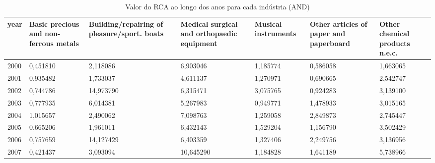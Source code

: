 \begin{table}
\centering
\caption{Valor do RCA ao longo dos anos para cada indústria (AND)}
\begin{tabular}{p{1cm}p{2cm}p{2cm}p{2cm}p{2cm}p{2cm}p{2cm}}
\toprule
 year &  Basic precious and non-ferrous metals &  Building/repairing of pleasure/sport. boats &  Medical surgical and orthopaedic equipment &  Musical instruments &  Other articles of paper and paperboard &  Other chemical products n.e.c. \\
\midrule
 2000 &                               0,451810 &                                     2,118086 &                                    6,903046 &             1,185774 &                                0,586058 &                        1,663065 \\
 2001 &                               0,935482 &                                     1,733037 &                                    4,611137 &             1,270971 &                                0,690665 &                        2,542747 \\
 2002 &                               0,744786 &                                    14,973790 &                                    6,315471 &             3,075765 &                                0,924283 &                        3,139100 \\
 2003 &                               0,777935 &                                     6,014381 &                                    5,267983 &             0,949771 &                                1,478933 &                        3,015165 \\
 2004 &                               1,015657 &                                     2,490062 &                                    7,098763 &             1,259058 &                                2,849873 &                        2,745447 \\
 2005 &                               0,665206 &                                     1,961011 &                                    6,432143 &             1,529204 &                                1,156790 &                        3,502429 \\
 2006 &                               0,757659 &                                    14,127429 &                                    6,403359 &             1,327406 &                                2,249756 &                        3,136956 \\
 2007 &                               0,421437 &                                     3,093094 &                                   10,645290 &             1,184828 &                                1,641189 &                        5,738966 \\

\end{tabular}
\end{table}
